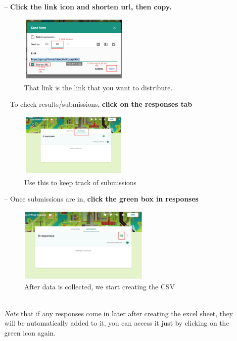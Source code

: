 \documentclass[10pt]{article}
\begin{document}
\begin{enumerate}
\begin{figure}[h]
\end{figure}
\newpage
\item[--] \textbf{Click the link icon and shorten url, then copy.}  
\begin{figure}[h]
\caption{That link is the link that you want to distribute.}
\centering
\includegraphics[width=0.5\textwidth]{pic3}
\end{figure}
\item[--] To check results/submissions, \textbf{click on the responses tab}
\begin{figure}[h]
\caption{Use this to keep track of submissions}
\centering
\includegraphics[width=0.5\textwidth]{pic4}
\end{figure}
\item[--] Once submissions are in, \textbf{click the green box in responses}
\begin{figure}[h]
\caption{After data is collected, we start creating the CSV}
\centering
\includegraphics[width=0.6\textwidth]{pic5}
\end{figure}\\
\textit{Note} that if any responses come in later after creating the excel sheet, they will be automatically added to it, you can access it just by clicking on the green icon again.

\end{enumerate}
\end{document}
